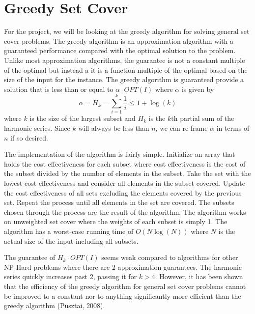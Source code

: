 \section{Greedy Set Cover}
For the project, we will be looking at the greedy algorithm for solving general set cover problems. The greedy algorithm is an approximation algorithm with a guaranteed performance compared with the optimal solution to the problem. Unlike most approximation algorithms, the guarantee is not a constant multiple of the optimal but instead a it is a function multiple of the optimal based on the size of the input for the instance. The greedy algorithm is guaranteed provide a solution that is less than or equal to $\alpha \cdot OPT(I)$ where $\alpha$ is given by $$\alpha = H_k = \sum_{i=1}^k \frac{1}{i}\leq 1+\log(k)$$ where $k$ is the size of the largest subset and $H_k$ is the $k$th partial sum of the harmonic series. Since $k$ will always be less than $n$, we can re-frame $\alpha$ in terms of $n$ if so desired.

The implementation of the algorithm is fairly simple. Initialize an array that holds the cost effectiveness for each subset where cost effectiveness is the cost of the subset divided by the number of elements in the subset. Take the set with the lowest cost effectiveness and consider all elements in the subset covered. Update the cost effectiveness of all sets excluding the elements covered by the previous set. Repeat the process until all elements in the set are covered. The subsets chosen through the process are the result of the algorithm. The algorithm works on unweighted set cover where the weights of each subset is simply 1. The algorithm has a worst-case running time of $O(N\log(N))$ where $N$ is the actual size of the input including all subsets.

The guarantee of $H_k\cdot OPT(I)$ seems weak compared to algorithms for other NP-Hard problems where there are 2-approximation guarantees. The harmonic series quickly increases past 2, passing it for $k>4$. However, it has been shown that the efficiency of the greedy algorithm for general set cover problems cannot be improved to a constant nor to anything significantly more efficient than the greedy algorithm %
(Pusztai, 2008).

